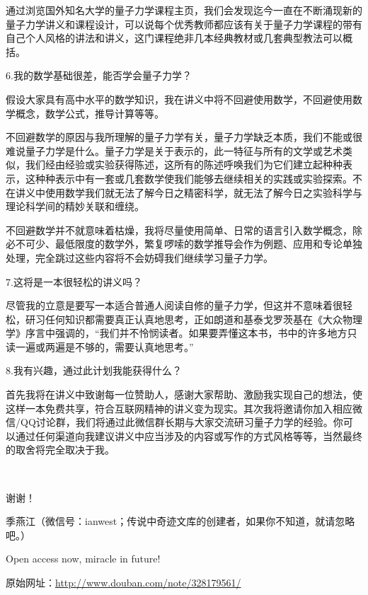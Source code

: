 通过浏览国外知名大学的量子力学课程主页，我们会发现迄今一直在不断涌现新的量子力学讲义和课程设计，可以说每个优秀教师都应该有关于量子力学课程的带有自己个人风格的讲法和讲义，这门课程绝非几本经典教材或几套典型教法可以概括。

6.我的数学基础很差，能否学会量子力学？

假设大家具有高中水平的数学知识，我在讲义中将不回避使用数学，不回避使用数学概念，数学公式，推导计算等等。

不回避数学的原因与我所理解的量子力学有关，量子力学缺乏本质，我们不能或很难说量子力学是什么。量子力学是关于表示的，此一特征与所有的文学或艺术类似，我们经由经验或实验获得陈述，这所有的陈述呼唤我们为它们建立起种种表示，这种种表示中有一套或几套数学使我们能够去继续相关的实践或实验探索。不在讲义中使用数学我们就无法了解今日之精密科学，就无法了解今日之实验科学与理论科学间的精妙关联和缠绕。

不回避数学并不就意味着枯燥，我将尽量使用简单、日常的语言引入数学概念，除必不可少、最低限度的数学外，繁复啰嗦的数学推导会作为例题、应用和专论单独处理，完全跳过这些内容将不会妨碍我们继续学习量子力学。

7.这将是一本很轻松的讲义吗？

尽管我的立意是要写一本适合普通人阅读自修的量子力学，但这并不意味着很轻松，研习任何知识都需要真正认真地思考，正如朗道和基泰戈罗茨基在《大众物理学》序言中强调的，“我们并不怜悯读者。如果要弄懂这本书，书中的许多地方只读一遍或两遍是不够的，需要认真地思考。”

8.我有兴趣，通过此计划我能获得什么？

首先我将在讲义中致谢每一位赞助人，感谢大家帮助、激励我实现自己的想法，使这样一本免费共享，符合互联网精神的讲义变为现实。其次我将邀请你加入相应微信/QQ讨论群，我们将通过此微信群长期与大家交流研习量子力学的经验。你可以通过任何渠道向我建议讲义中应当涉及的内容或写作的方式风格等等，当然最终的取舍将完全取决于我。

~~


谢谢！

季燕江（微信号：ianwest；传说中奇迹文库的创建者，如果你不知道，就请忽略吧。）

Open access now, miracle in future!

原始网址：\url{http://www.douban.com/note/328179561/}


